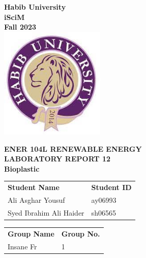 \documentclass[a4paper, 12pt, english]{article}
\begin{document}
\begin{titlepage}
	\begin{center}
		\textbf{\LARGE Habib University}\\[0.5cm]
		\textbf{\large iSciM}\\[0.2cm]
		\textbf {\large Fall 2023}\\[0.2cm]
		\vspace{20pt}
		\includegraphics[width=5cm]{../habiblogo.jpg}\\[1cm]
		\par
		\vspace{20pt}
		\textbf{\Large ENER 104L RENEWABLE ENERGY}\\
		\vspace{15pt}
		\myrule[1pt][7pt]
		\textbf{\LARGE  LABORATORY REPORT 12}\\
		\vspace{15pt}
		\textbf{\large Bioplastic}\\
		\myrule[1pt][7pt]
		\vspace{25pt}
		\begin{tabular}{@{}p{5cm}p{3cm}@{}}
			\textbf{\large Student Name} & \textbf{\large Student ID} \\
			Ali Asghar Yousuf            & ay06993                    \\ %
			Syed Ibrahim Ali Haider      & sh06565                    \\ %
		\end{tabular}

		\vspace{10pt}
		\begin{tabular}{@{}p{5cm}p{3cm}@{}}
			\textbf{\large Group Name} & \textbf{\large Group No.} \\
			Insane Fr                  & 1                         \\
		\end{tabular}


\end{center}
\end{titlepage}
\end{document}
